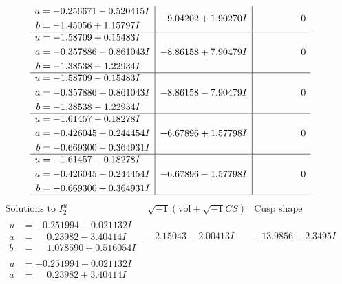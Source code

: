 \documentclass[1p]{elsarticle_modified}
\theoremstyle{definition}
\newcommand{\I}{\sqrt{-1}}
\begin{document}
$$\begin{array}{c|c|c}
\begin{aligned}
a &= -0.256671 - 0.520415 I \\
b &= -1.45056 + 1.15797 I\end{aligned}
 & -9.04202 + 1.90270 I & \phantom{-0.000000 } 0 \\ \hline\begin{aligned}
u &= -1.58709 + 0.15483 I \\
a &= -0.357886 - 0.861043 I \\
b &= -1.38538 + 1.22934 I\end{aligned}
 & -8.86158 + 7.90479 I & \phantom{-0.000000 } 0 \\ \hline\begin{aligned}
u &= -1.58709 - 0.15483 I \\
a &= -0.357886 + 0.861043 I \\
b &= -1.38538 - 1.22934 I\end{aligned}
 & -8.86158 - 7.90479 I & \phantom{-0.000000 } 0 \\ \hline\begin{aligned}
u &= -1.61457 + 0.18278 I \\
a &= -0.426045 + 0.244454 I \\
b &= -0.669300 - 0.364931 I\end{aligned}
 & -6.67896 + 1.57798 I & \phantom{-0.000000 } 0 \\ \hline\begin{aligned}
u &= -1.61457 - 0.18278 I \\
a &= -0.426045 - 0.244454 I \\
b &= -0.669300 + 0.364931 I\end{aligned}
 & -6.67896 - 1.57798 I & \phantom{-0.000000 } 0\\
 \hline 
 \end{array}$$\newpage$$\begin{array}{c|c|c}  
\text{Solutions to }I^u_{2}& \I (\text{vol} + \sqrt{-1}CS) & \text{Cusp shape}\\
 \hline 
\begin{aligned}
u &= -0.251994 + 0.021132 I \\
a &= \phantom{-}0.23982 - 3.40414 I \\
b &= \phantom{-}1.078590 + 0.516054 I\end{aligned}
 & -2.15043 - 2.00413 I & -13.9856 + 2.3495 I \\ \hline\begin{aligned}
u &= -0.251994 - 0.021132 I \\
a &= \phantom{-}0.23982 + 3.40414 I \\

\end{aligned}
\end{array}$$
\end{document}
